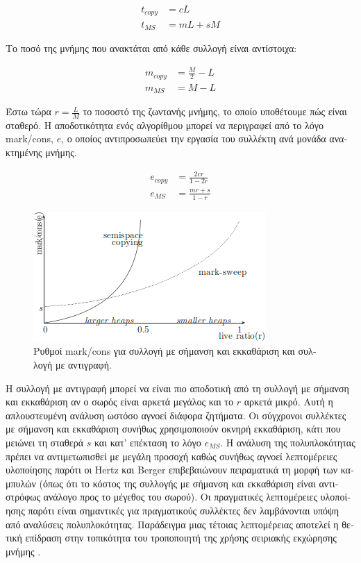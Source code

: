 \begin{greek}
\begin{align}
t_{copy} &= cL \\
 t_{MS} &= mL+sM
\end{align}

Το ποσό της μνήμης που ανακτάται από κάθε συλλογή είναι αντίστοιχα:

\begin{align}
m_{copy} &= \frac{M}{2}-L \\
 m_{MS} &= M-L
\end{align}

Έστω τώρα $r=\frac{L}{M}$ το ποσοστό της ζωντανής μνήμης, το
οποίο υποθέτουμε πώς είναι σταθερό. Η αποδοτικότητα ενός αλγορίθμου
μπορεί να περιγραφεί από το λόγο mark/cons, $e$, ο οποίος αντιπροσωπεύει
την εργασία του συλλέκτη ανά μονάδα ανακτημένης μνήμης.

\begin{align}
e_{copy} &= \frac{2cr}{1-2r} \\
 e_{MS} &= \frac{mr+s}{1-r}
\end{align}

\begin{figure}[H]
  \centering
  \includegraphics{figures/cop_5}
  \caption[Ρυθμοί mark/cons για συλλογή με σήμανση και εκκαθάριση
           και συλλογή με αντιγραφή.]
    {Ρυθμοί mark/cons για συλλογή με σήμανση και εκκαθάριση και
     συλλογή με αντιγραφή.}
  \label{fig:cop_5}
\end{figure}

Η συλλογή με αντιγραφή μπορεί να είναι πιο αποδοτική από τη
συλλογή με σήμανση και εκκαθάριση αν ο σωρός είναι αρκετά μεγάλος
και το $r$ αρκετά μικρό. Αυτή η απλουστευμένη ανάλυση ωστόσο
αγνοεί διάφορα ζητήματα. Οι σύγχρονοι συλλέκτες με σήμανση
και εκκαθάριση συνήθως χρησιμοποιούν οκνηρή εκκαθάριση, κάτι
που μειώνει τη σταθερά $s$ και κατ' επέκταση το λόγο $e_{MS}$.
Η ανάλυση της πολυπλοκότητας πρέπει να αντιμετωπισθεί με μεγάλη
προσοχή καθώς συνήθως αγνοεί λεπτομέρειες υλοποίησης παρότι
οι Hertz και Berger \cite{DBLP:conf/oopsla/HertzB05} επιβεβαιώνουν πειραματικά τη μορφή 
των καμπυλών (όπως ότι το κόστος της συλλογής με σήμανση και
εκκαθάριση είναι αντιστρόφως ανάλογο προς το μέγεθος του σωρού).
Οι πραγματικές λεπτομέρειες υλοποίησης παρότι είναι σημαντικές 
για πραγματικούς συλλέκτες δεν λαμβάνονται υπόψη από αναλύσεις
πολυπλοκότητας. Παράδειγμα μιας τέτοιας λεπτομέρειας αποτελεί
η θετική επίδραση στην τοπικότητα του τροποποιητή της χρήσης
σειριακής εκχώρησης μνήμης \cite{DBLP:conf/icse/BlackburnCM04}.


\end{greek}
